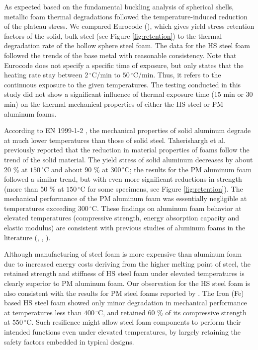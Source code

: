 \documentclass[review]{elsarticle}
\begin{document}
{As expected based on the fundamental buckling analysis of spherical shells, metallic foam thermal degradations followed the temperature-induced reduction of the plateau stress. We compared Eurocode (\cite{EC3-1-2}), which gives yield stress retention factors of the solid, bulk steel (see Figure \ref{fig:retention}) to the thermal degradation rate of the hollow sphere steel foam. The data for the HS steel foam followed the trends of the base metal with reasonable consistency. Note that Eurocode does not specify a specific time of exposure, but only states that the heating rate stay between  $2\,^{\circ}\mathrm{C}$/min to  $50\,^{\circ}\mathrm{C}$/min. Thus, it refers to the continuous exposure to the given temperatures. The testing conducted in this study did not show a significant influence of thermal exposure time (15 min or 30 min) on the thermal-mechanical properties of either the HS steel or PM aluminum foams. 

According to EN 1999-1-2 \cite{EC9-1-2}, the mechanical properties of solid aluminum degrade at much lower temperatures than those of solid steel. Taherishargh et al. \cite{Taherishargh2018} previously reported that the reduction in material properties of foams follow the trend of the solid material. The yield stress of solid aluminum decreases by about 20 \% at $150\,^{\circ}\mathrm{C}$ and about 90 \% at $300\,^{\circ}\mathrm{C}$; the results for the PM aluminum foam followed a similar trend, but with even more significant reductions in strength (more than 50 \% at $150\,^{\circ}\mathrm{C}$ for some specimens, see Figure  \ref{fig:retention}). The mechanical performance of the PM aluminum foam was essentially negligible at temperatures exceeding $300\,^{\circ}\mathrm{C}$. These findings on aluminum foam behavior at elevated temperatures (compressive strength, energy absorption capacity and elastic modulus) are consistent with previous studies of aluminum foams in the literature (\cite{Aly2007}, \cite{Kovacicetal2016}, \cite{Liuetal2016}).

Although manufacturing of steel foam is more expensive than aluminum foam due to increased energy costs deriving from the higher melting point of steel, the retained strength and stiffness of HS steel foam under elevated temperatures is clearly superior to PM aluminum foam. Our observation for the HS steel foam is also consistent with the results for PM steel foams reported by \cite{BekozOktay2014}. The Iron (Fe) based HS steel foam showed only minor degradation in mechanical performance at temperatures less than $400\,^{\circ}\mathrm{C}$, and retained 60 \% of its compressive strength at $550\,^{\circ}\mathrm{C}$. Such resilience might allow steel foam components to perform their intended functions even under elevated temperatures, by largely retaining the safety factors embedded in typical designs.

}
\end{document}
